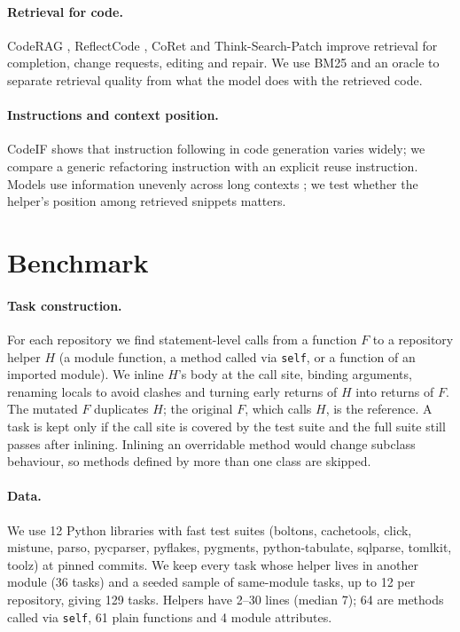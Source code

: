 \documentclass[11pt]{article}
\begin{document}
\paragraph{Retrieval for code.}
CodeRAG \citep{zhang-etal-2025-coderag}, ReflectCode \citep{liu-etal-2025-beyond-function},
CoRet \citep{fehr-etal-2025-coret} and Think-Search-Patch \citep{xiong-etal-2025-think} improve retrieval
for completion, change requests, editing and repair. We use BM25 \citep{robertson2009bm25} and an oracle
to separate retrieval quality from what the model does with the retrieved code.

\paragraph{Instructions and context position.}
CodeIF \citep{yan-etal-2025-codeif} shows that instruction following in code generation varies widely;
we compare a generic refactoring instruction with an explicit reuse instruction. Models use information
unevenly across long contexts \citep{liu-etal-2024-lost}; we test whether the helper's position among
retrieved snippets matters.

\section{Benchmark}
\label{sec:bench}

\paragraph{Task construction.}
For each repository we find statement-level calls from a function $F$ to a repository helper $H$
(a module function, a method called via \texttt{self}, or a function of an imported module).
We inline $H$'s body at the call site, binding arguments, renaming locals to avoid clashes and
turning early returns of $H$ into returns of $F$. The mutated $F$ duplicates $H$; the original $F$,
which calls $H$, is the reference. A task is kept only if the call site is covered by the test suite
and the full suite still passes after inlining. Inlining an overridable method would change subclass
behaviour, so methods defined by more than one class are skipped.

\paragraph{Data.}
We use 12 Python libraries with fast test suites (boltons, cachetools, click, mistune, parso, pycparser,
pyflakes, pygments, python-tabulate, sqlparse, tomlkit, toolz) at pinned commits. We keep every task whose
helper lives in another module (36 tasks) and a seeded sample of same-module tasks, up to 12 per repository,
giving 129 tasks. Helpers have 2--30 lines (median 7); 64 are methods called via \texttt{self}, 61 plain
functions and 4 module attributes.
\end{document}
